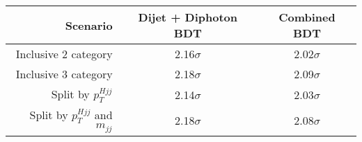 \begin{tabular}{ r | c | c }
\hline
Scenario                          & Dijet + Diphoton BDT    & Combined BDT   \\
\hline
Inclusive 2 category              & 2.16$\sigma$            & 2.02$\sigma$   \\
Inclusive 3 category              & 2.18$\sigma$            & 2.09$\sigma$   \\
Split by $p_T^{Hjj}$              & 2.14$\sigma$            & 2.03$\sigma$   \\
Split by $p_T^{Hjj}$ and $m_{jj}$ & 2.18$\sigma$            & 2.08$\sigma$   \\
\hline
\end{tabular}
